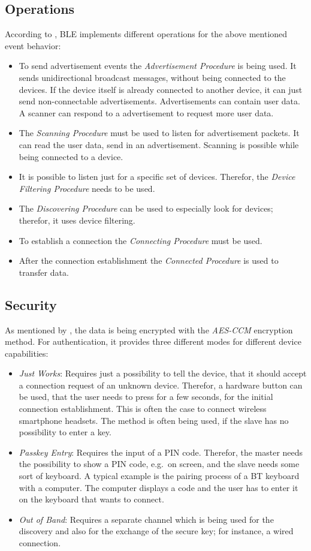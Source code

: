 \subsection*{Operations}
According to \citet{bluetooth:spec}, \ac{BLE} implements different operations for the above mentioned event behavior:
\begin{itemize}
  \item To send advertisement events the \emph{Advertisement Procedure} is being used. It sends unidirectional broadcast messages, without being connected to the devices. If the device itself is already connected to another device, it can just send non-connectable advertisements. Advertisements can contain user data. A scanner can respond to a advertisement to request more user data.
  \item The \emph{Scanning Procedure} must be used to listen for advertisement packets. It can read the user data, send in an advertisement. Scanning is possible while being connected to a device.
  \item It is possible to listen just for a specific set of devices. Therefor, the \emph{Device Filtering Procedure} needs to be used.
  \item The \emph{Discovering Procedure} can be used to especially look for devices; therefor, it  uses device filtering.
  \item To establish a connection the \emph{Connecting Procedure} must be used.
  \item After the connection establishment the \emph{Connected Procedure} is used to transfer data.
\end{itemize}

\subsection*{Security}
As mentioned by \citet{bluetooth:spec}, the data is being encrypted with the \emph{AES-CCM} encryption method. For authentication, it provides three different modes for different device capabilities:
\begin{itemize}
  \item \emph{Just Works}: Requires just a possibility to tell the device, that it should accept a connection request of an unknown device. Therefor, a hardware button can be used, that the user needs to press for a few seconds, for the initial connection establishment. This is often the case to connect wireless smartphone headsets. The method is often being used, if the slave has no possibility to enter a key.
  \item \emph{Passkey Entry}: Requires the input of a PIN code. Therefor, the master needs the possibility to show a PIN code, e.g.\ on screen, and the slave needs some sort of keyboard. A typical example is the pairing process of a \ac{BT} keyboard with a computer. The computer displays a code and the user has to enter it on the keyboard that wants to connect.
  \item \emph{Out of Band}: Requires a separate channel which is being used for the discovery and also for the exchange of the secure key; for instance, a wired connection.
\end{itemize}


